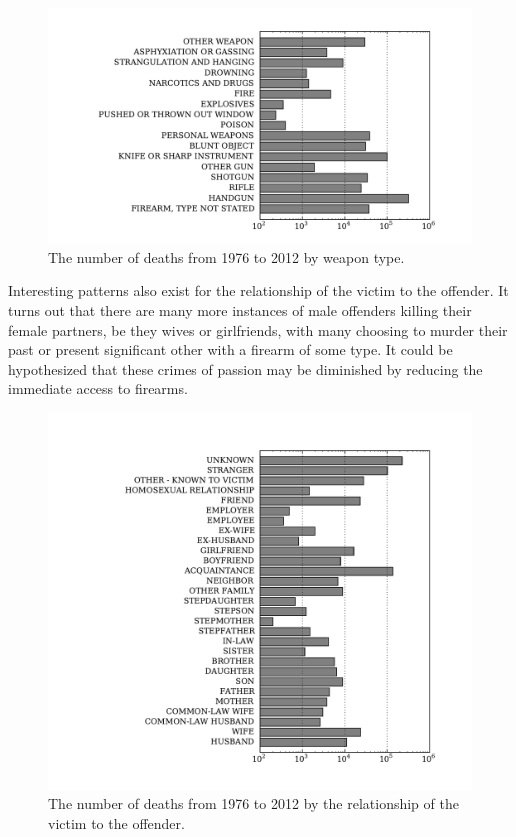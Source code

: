 \documentclass{evanarticle}
\begin{document}
\begin{figure}[H]
  \centering
    \includegraphics[width=1.0\linewidth]{images/weaps.pdf}
  \caption{The number of deaths from 1976 to 2012 by weapon type.}
\end{figure}

Interesting patterns also exist for the relationship of the victim to the offender.  It turns out that there are many more instances of male offenders killing their female partners, be they wives or girlfriends, with many choosing to murder their past or present significant other with a firearm of some type.  It could be hypothesized that these crimes of passion may be diminished by reducing the immediate access to firearms.

\begin{figure}[H]
  \centering
    \includegraphics[width=1.0\linewidth]{images/relationship.pdf}
  \caption{The number of deaths from 1976 to 2012 by the relationship of the victim to the offender.}
\end{figure}
\end{document}
